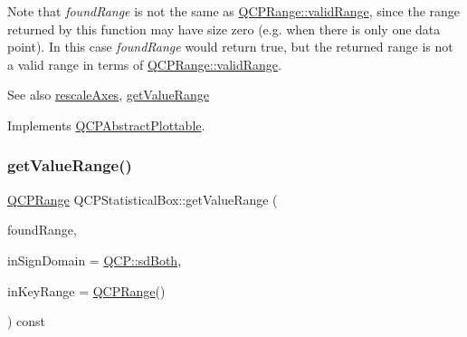 Note that {\itshape found\+Range} is not the same as \hyperlink{class_q_c_p_range_ab38bd4841c77c7bb86c9eea0f142dcc0}{Q\+C\+P\+Range\+::valid\+Range}, since the range returned by this function may have size zero (e.\+g. when there is only one data point). In this case {\itshape found\+Range} would return true, but the returned range is not a valid range in terms of \hyperlink{class_q_c_p_range_ab38bd4841c77c7bb86c9eea0f142dcc0}{Q\+C\+P\+Range\+::valid\+Range}.

\begin{DoxySeeAlso}{See also}
\hyperlink{class_q_c_p_abstract_plottable_a1491c4a606bccd2d09e65e11b79eb882}{rescale\+Axes}, \hyperlink{class_q_c_p_statistical_box_ab3388a21d0c2e86fbc0cba9c06ceb49b}{get\+Value\+Range} 
\end{DoxySeeAlso}


Implements \hyperlink{class_q_c_p_abstract_plottable_a4da16d3cd4b509e1104a9b0275623c96}{Q\+C\+P\+Abstract\+Plottable}.

\mbox{\label{class_q_c_p_statistical_box_ab3388a21d0c2e86fbc0cba9c06ceb49b}} 
\subsubsection{\texorpdfstring{get\+Value\+Range()}{getValueRange()}\hspace{0.1cm}{\footnotesize\ttfamily [1/2]}}
{\footnotesize\ttfamily \hyperlink{class_q_c_p_range}{Q\+C\+P\+Range} Q\+C\+P\+Statistical\+Box\+::get\+Value\+Range (\begin{DoxyParamCaption}\item[{bool \&}]{found\+Range,  }\item[{\hyperlink{namespace_q_c_p_afd50e7cf431af385614987d8553ff8a9}{Q\+C\+P\+::\+Sign\+Domain}}]{in\+Sign\+Domain = {\ttfamily \hyperlink{namespace_q_c_p_afd50e7cf431af385614987d8553ff8a9a3dee7e9cd2fedce9253b83e172626a6c}{Q\+C\+P\+::sd\+Both}},  }\item[{const \hyperlink{class_q_c_p_range}{Q\+C\+P\+Range} \&}]{in\+Key\+Range = {\ttfamily \hyperlink{class_q_c_p_range}{Q\+C\+P\+Range}()} }\end{DoxyParamCaption}) const\hspace{0.3cm}{\ttfamily [virtual]}}

